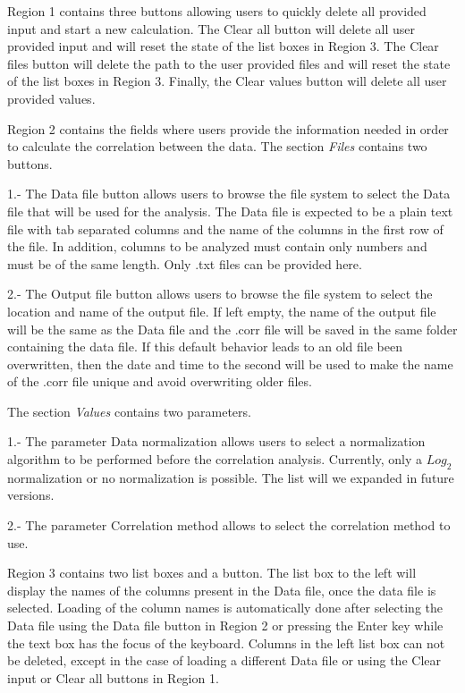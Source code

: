 Region \num{1} contains three buttons allowing users to quickly delete all provided input and start a new calculation. The Clear all button will delete all user provided input and will reset the state of the list boxes in Region \num{3}. The Clear files button will delete the path to the user provided files and will reset the state of the list boxes in Region \num{3}. Finally, the Clear values button will delete all user provided values.

Region \num{2} contains the fields where users provide the information needed in order to calculate the correlation between the data. The section \textit{Files} contains two buttons.

\num{1}.- The Data file button allows users to browse the file system to select the Data file that will be used for the analysis. The Data file is expected to be a plain text file with tab separated columns and the name of the columns in the first row of the file. In addition, columns to be analyzed must contain only numbers and must be of the same length. Only .txt files can be provided here. 

\num{2}.- The Output file button allows users to browse the file system to select the location and name of the output file. If left empty, the name of the output file will be the same as the Data file and the .corr file will be saved in the same folder containing the data file. If this default behavior leads to an old file been overwritten, then the date and time to the second will be used to make the name of the .corr file unique and avoid overwriting older files. 

The section \textit{Values} contains two parameters.

\num{1}.- The parameter Data normalization allows users to select a normalization algorithm to be performed before the correlation analysis. Currently, only a $Log_{2}$ normalization or no normalization is possible. The list will we expanded in future versions. 

\num{2}.- The parameter Correlation method allows to select the correlation method to use.

Region \num{3} contains two list boxes and a button. The list box to the left will display the names of the columns present in the Data file, once the data file is selected. Loading of the column names is automatically done after selecting the Data file using the Data file button in Region \num{2} or pressing the Enter key while the text box has the focus of the keyboard. Columns in the left list box can not be deleted, except in the case of loading a different Data file or using the Clear input or Clear all buttons in Region \num{1}. 

